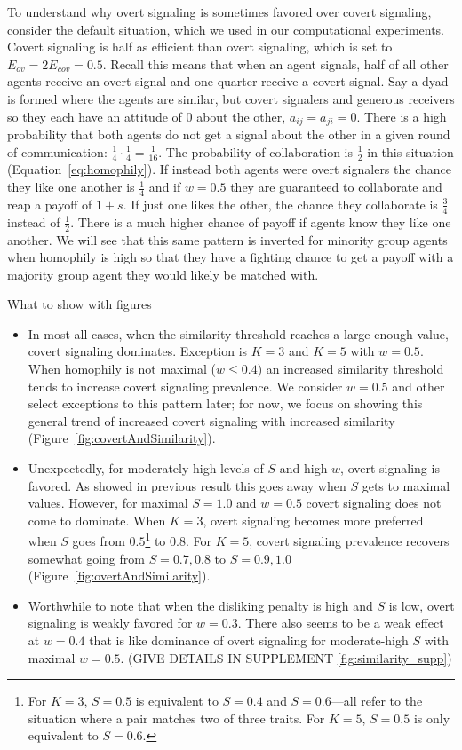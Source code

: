 \documentclass[11pt,letterpaper]{article}
\begin{document}
To understand why overt signaling is sometimes favored over covert signaling,
consider the default situation, which we used in our
computational experiments. Covert signaling is
half as efficient than overt signaling, which is set to $E_{ov} = 2E_{cov} = 0.5$. 
Recall this means that when an agent signals, half of all other agents receive
an overt signal and one quarter receive a covert signal. Say a dyad is formed
where the agents are similar, but covert signalers and generous receivers
so they each have an attitude of 0 about the other, $a_{ij} = a_{ji} = 0$. 
There is a high probability that both agents do not get a signal about the other
in a given round of communication: $\frac{1}{4} \cdot \frac{1}{4} = \frac{1}{16}$.
The probability of collaboration is $\frac{1}{2}$ in this situation 
(Equation~\ref{eq:homophily}). If instead both agents were 
overt signalers the chance they like one another is $\frac{1}{4}$ and if
$w=0.5$ they are guaranteed to collaborate and reap a payoff of $1 + s$. 
If just one likes the other, the chance they collaborate is $\frac{3}{4}$
instead of $\frac{1}{2}$. There is a much higher chance of payoff if agents
know they like one another. We will see that this same pattern is inverted for
minority group agents when homophily is high so that they have a fighting chance to
get a payoff with a majority group agent they would likely be matched with. 

What to show with figures
\begin{itemize}
  \item In most all cases, when the similarity threshold reaches a large enough 
    value, covert signaling dominates. Exception is $K=3$ and $K=5$ with 
    $w=0.5$. When homophily is not maximal ($w \leq 0.4$) an increased 
    similarity threshold tends to increase covert signaling prevalence. 
    We consider $w=0.5$ and other select exceptions to this pattern later; 
    for now, we focus on showing this general trend of increased covert signaling
    with increased similarity (Figure~\ref{fig:covertAndSimilarity}).
  \item Unexpectedly, for moderately high levels of $S$ and high $w$, overt signaling is
    favored. As showed in previous result this goes away when $S$ gets to
    maximal values. However, for maximal $S=1.0$ and $w=0.5$ covert signaling
    does not come to dominate. When $K=3$, overt signaling becomes more
    preferred when $S$ goes from $0.5$\footnote{For $K=3$, $S=0.5$ is equivalent
        to $S=0.4$ and $S=0.6$---all refer to the situation where a pair matches
    two of three traits. For $K=5$, $S=0.5$ is only equivalent to $S=0.6$.}
    to $0.8$. For $K=5$, covert signaling prevalence recovers somewhat going
    from $S=0.7,0.8$ to $S=0.9,1.0$ (Figure~\ref{fig:overtAndSimilarity}).
  \item Worthwhile to note that when the disliking penalty is high and $S$ is low, 
      overt signaling is weakly favored for $w=0.3$. There also seems to be a
      weak effect at $w=0.4$ that is like dominance of overt signaling for
      moderate-high $S$ with maximal $w=0.5$.
      (GIVE DETAILS IN SUPPLEMENT \ref{fig:similarity_supp}) 
\end{itemize}
\end{document}
